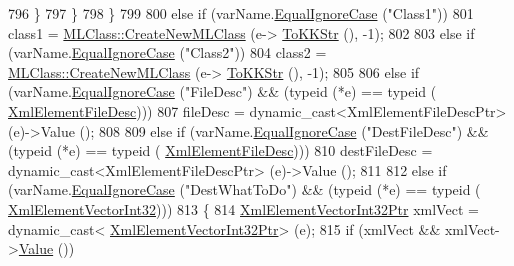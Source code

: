 \begin{DoxyCode}
796             \}
797           \}
798         \}
799 
800         \textcolor{keywordflow}{else} \textcolor{keywordflow}{if}  (varName.\hyperlink{class_k_k_b_1_1_k_k_str_a562f9696417c53f66bc4088eac072ab5}{EqualIgnoreCase} (\textcolor{stringliteral}{"Class1"}))
801           class1 = \hyperlink{class_k_k_m_l_l_1_1_m_l_class_a9fd24c617c42d89afc92414575e00e9a}{MLClass::CreateNewMLClass} (e->
      \hyperlink{class_k_k_b_1_1_xml_element_a3028fc03b79509e6378749f6a8b426b9}{ToKKStr} (), -1);
802 
803         \textcolor{keywordflow}{else} \textcolor{keywordflow}{if}  (varName.\hyperlink{class_k_k_b_1_1_k_k_str_a562f9696417c53f66bc4088eac072ab5}{EqualIgnoreCase} (\textcolor{stringliteral}{"Class2"}))
804           class2 = \hyperlink{class_k_k_m_l_l_1_1_m_l_class_a9fd24c617c42d89afc92414575e00e9a}{MLClass::CreateNewMLClass} (e->
      \hyperlink{class_k_k_b_1_1_xml_element_a3028fc03b79509e6378749f6a8b426b9}{ToKKStr} (), -1);
805 
806         \textcolor{keywordflow}{else} \textcolor{keywordflow}{if}  (varName.\hyperlink{class_k_k_b_1_1_k_k_str_a562f9696417c53f66bc4088eac072ab5}{EqualIgnoreCase} (\textcolor{stringliteral}{"FileDesc"})  &&  (\textcolor{keyword}{typeid} (*e) == \textcolor{keyword}{typeid} (
      \hyperlink{class_k_k_m_l_l_1_1_xml_element_file_desc}{XmlElementFileDesc})))
807           fileDesc = dynamic\_cast<XmlElementFileDescPtr> (e)->Value ();
808 
809         \textcolor{keywordflow}{else} \textcolor{keywordflow}{if}  (varName.\hyperlink{class_k_k_b_1_1_k_k_str_a562f9696417c53f66bc4088eac072ab5}{EqualIgnoreCase} (\textcolor{stringliteral}{"DestFileDesc"})  &&  (\textcolor{keyword}{typeid} (*e) == \textcolor{keyword}{typeid} (
      \hyperlink{class_k_k_m_l_l_1_1_xml_element_file_desc}{XmlElementFileDesc})))
810           destFileDesc = dynamic\_cast<XmlElementFileDescPtr> (e)->Value ();
811 
812         \textcolor{keywordflow}{else} \textcolor{keywordflow}{if}  (varName.\hyperlink{class_k_k_b_1_1_k_k_str_a562f9696417c53f66bc4088eac072ab5}{EqualIgnoreCase} (\textcolor{stringliteral}{"DestWhatToDo"})  &&  (\textcolor{keyword}{typeid} (*e) == \textcolor{keyword}{typeid} (
      \hyperlink{class_k_k_b_1_1_xml_element_vector_int32}{XmlElementVectorInt32})))
813         \{
814           \hyperlink{class_k_k_b_1_1_xml_element_vector_int32}{XmlElementVectorInt32Ptr}  xmlVect = \textcolor{keyword}{dynamic\_cast<}
      \hyperlink{class_k_k_b_1_1_xml_element_vector_int32}{XmlElementVectorInt32Ptr}\textcolor{keyword}{>} (e);
815           \textcolor{keywordflow}{if}  (xmlVect  &&  xmlVect->\hyperlink{class_k_k_b_1_1_xml_element_vector_int32_ab2877c6bbf603155fc89cb974bc02883}{Value} ())

\end{DoxyCode}
